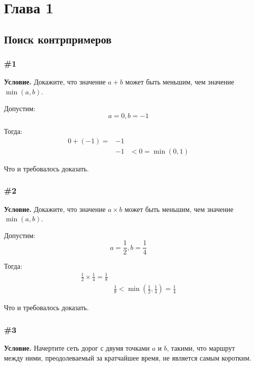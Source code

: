 \documentclass{article}
\begin{document}
\section{Глава 1}

\subsection{Поиск контрпримеров}

\subsubsection{\#1}

\textbf{Условие.}
Докажите, что значение \(a + b\) может быть меньшим, чем значение \(\min(a, b)\).


Допустим:
\begin{equation}
    a = 0, b=-1
\end{equation}

Тогда:
\begin{eqnarray}
    0 + (-1) = &-1& \\
    &-1& < 0 = \min(0, 1)
\end{eqnarray}

Что и требовалось доказать.

\subsubsection{\#2}

\textbf{Условие.}
Докажите, что значение \(a \times b\) может быть меньшим, чем значение \(\min(a, b)\).

Допустим:
\begin{equation}
    a = \frac{1}{2}, b = \frac{1}{4}
\end{equation}

Тогда:
\begin{eqnarray}
    \frac{1}{2} \times \frac{1}{4} =  \frac{1}{8} & \\
    & \frac{1}{8} < \min(\frac{1}{2}, \frac{1}{4}) = \frac{1}{4}
\end{eqnarray}

Что и требовалось доказать.


\subsubsection{\#3}

\textbf{Условие.}
Начертите сеть дорог с двумя точками \(a\) и \(b\), такими, что маршрут между ними,
преодолеваемый за кратчайшее время, не является самым коротким.
\end{document}

